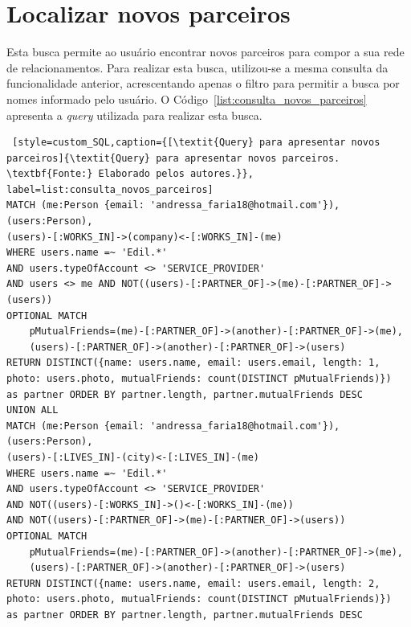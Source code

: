 \section{Localizar novos parceiros}

\par Esta busca permite ao usuário encontrar novos parceiros para compor a sua rede de relacionamentos. Para realizar esta busca, utilizou-se a mesma consulta da funcionalidade anterior, acrescentando apenas o filtro para permitir a busca por nomes informado pelo usuário. O Código~\ref{list:consulta_novos_parceiros} apresenta a \textit{query} utilizada para realizar esta busca.

\begin{lstlisting} [style=custom_SQL,caption={[\textit{Query} para apresentar novos parceiros]{\textit{Query} para apresentar novos parceiros. \textbf{Fonte:} Elaborado pelos autores.}}, label=list:consulta_novos_parceiros] 	
MATCH (me:Person {email: 'andressa_faria18@hotmail.com'}), (users:Person),
(users)-[:WORKS_IN]->(company)<-[:WORKS_IN]-(me)
WHERE users.name =~ 'Edil.*'
AND users.typeOfAccount <> 'SERVICE_PROVIDER'
AND users <> me AND NOT((users)-[:PARTNER_OF]->(me)-[:PARTNER_OF]->(users))  
OPTIONAL MATCH 
	pMutualFriends=(me)-[:PARTNER_OF]->(another)-[:PARTNER_OF]->(me), 
	(users)-[:PARTNER_OF]->(another)-[:PARTNER_OF]->(users) 
RETURN DISTINCT({name: users.name, email: users.email, length: 1, 
photo: users.photo, mutualFriends: count(DISTINCT pMutualFriends)}) 
as partner ORDER BY partner.length, partner.mutualFriends DESC 
UNION ALL 
MATCH (me:Person {email: 'andressa_faria18@hotmail.com'}), (users:Person),
(users)-[:LIVES_IN]-(city)<-[:LIVES_IN]-(me)
WHERE users.name =~ 'Edil.*'
AND users.typeOfAccount <> 'SERVICE_PROVIDER' 
AND NOT((users)-[:WORKS_IN]->()<-[:WORKS_IN]-(me)) 
AND NOT((users)-[:PARTNER_OF]->(me)-[:PARTNER_OF]->(users)) 
OPTIONAL MATCH 
	pMutualFriends=(me)-[:PARTNER_OF]->(another)-[:PARTNER_OF]->(me), 
	(users)-[:PARTNER_OF]->(another)-[:PARTNER_OF]->(users) 
RETURN DISTINCT({name: users.name, email: users.email, length: 2, 
photo: users.photo, mutualFriends: count(DISTINCT pMutualFriends)})
as partner ORDER BY partner.length, partner.mutualFriends DESC
\end{lstlisting}


